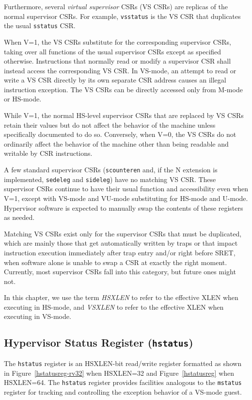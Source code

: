 Furthermore, several {\em virtual supervisor} CSRs (VS CSRs) are replicas
of the normal supervisor CSRs.
For example, {\tt vsstatus} is the VS CSR that duplicates the usual
{\tt sstatus} CSR.

When V=1, the VS CSRs substitute for the corresponding supervisor CSRs,
taking over all functions of the usual supervisor CSRs except as specified
otherwise.
Instructions that normally read or modify a supervisor CSR shall instead
access the corresponding VS CSR.
In VS-mode, an attempt to read or write a VS CSR directly by its own
separate CSR address causes an illegal instruction exception.
The VS CSRs can be directly accessed only from M-mode or HS-mode.

While V=1, the normal HS-level supervisor CSRs that are replaced by
VS CSRs retain their values but do
not affect the behavior of the machine unless specifically documented to
do so.
Conversely, when V=0, the VS CSRs do not ordinarily affect the behavior of
the machine other than being readable and writable by CSR instructions.

A few standard supervisor CSRs ({\tt scounteren} and, if the N extension
is implemented, {\tt sedeleg} and {\tt sideleg}) have no matching VS CSR.
These supervisor CSRs continue to have their usual function and
accessibility even when V=1, except with VS-mode and VU-mode substituting for
HS-mode and U-mode.
Hypervisor software is expected to manually swap the contents of these
registers as needed.

\begin{commentary}
Matching VS CSRs exist only for the supervisor CSRs that must be
duplicated, which are mainly those that get automatically written by
traps or that impact instruction execution immediately after trap entry
and/or right before SRET, when software alone is unable to swap a CSR at
exactly the right moment.
Currently, most supervisor CSRs fall into this category, but future ones
might not.
\end{commentary}

In this chapter, we use the term {\em HSXLEN} to refer to the effective XLEN
when executing in HS-mode, and {\em VSXLEN} to refer to the effective
XLEN when executing in VS-mode.

\subsection{Hypervisor Status Register ({\tt hstatus})}

The {\tt hstatus} register is an HSXLEN-bit read/write register
formatted as shown in Figure~\ref{hstatusreg-rv32} when HSXLEN=32 and
Figure~\ref{hstatusreg} when HSXLEN=64.
The {\tt hstatus}
register provides facilities analogous to the {\tt mstatus} register
for tracking and controlling the exception behavior of a VS-mode guest.

